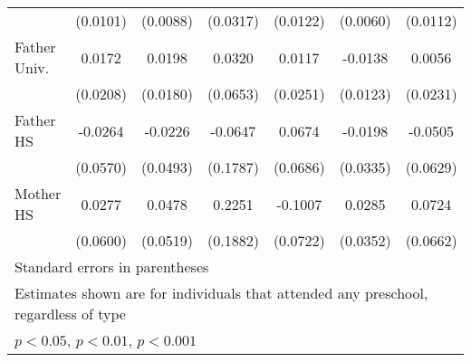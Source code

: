 \begin{table}[htbp]
\begin{tabular}{l*{6}{c}}
            &    (0.0101)         &    (0.0088)         &    (0.0317)         &    (0.0122)         &    (0.0060)         &    (0.0112)         \\
\addlinespace
Father Univ.&      0.0172         &      0.0198         &      0.0320         &      0.0117         &     -0.0138         &      0.0056         \\
            &    (0.0208)         &    (0.0180)         &    (0.0653)         &    (0.0251)         &    (0.0123)         &    (0.0231)         \\
\addlinespace
Father HS   &     -0.0264         &     -0.0226         &     -0.0647         &      0.0674         &     -0.0198         &     -0.0505         \\
            &    (0.0570)         &    (0.0493)         &    (0.1787)         &    (0.0686)         &    (0.0335)         &    (0.0629)         \\
\addlinespace
Mother HS   &      0.0277         &      0.0478         &      0.2251         &     -0.1007         &      0.0285         &      0.0724         \\
            &    (0.0600)         &    (0.0519)         &    (0.1882)         &    (0.0722)         &    (0.0352)         &    (0.0662)         \\
\bottomrule
\multicolumn{7}{l}{\footnotesize Standard errors in parentheses}\\
\multicolumn{7}{l}{\footnotesize Estimates shown are for individuals that attended any preschool, regardless of type}\\
\multicolumn{7}{l}{\footnotesize \sym{*} \(p<0.05\), \sym{**} \(p<0.01\), \sym{***} \(p<0.001\)}\\
\end{tabular}
\end{table}
